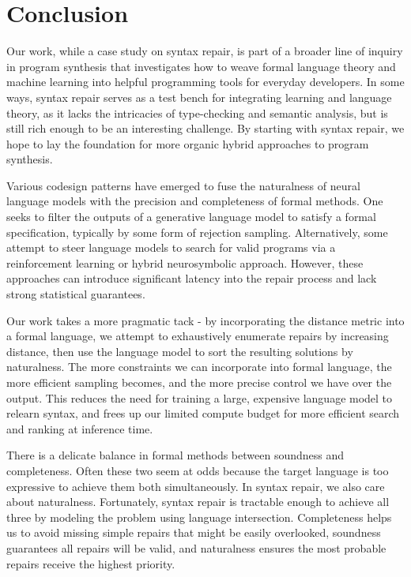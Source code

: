 \documentclass[popl.tex]{subfiles}
\begin{document}
\section{Conclusion}\label{sec:conclusion}

Our work, while a case study on syntax repair, is part of a broader line of inquiry in program synthesis that investigates how to weave formal language theory and machine learning into helpful programming tools for everyday developers. In some ways, syntax repair serves as a test bench for integrating learning and language theory, as it lacks the intricacies of type-checking and semantic analysis, but is still rich enough to be an interesting challenge. By starting with syntax repair, we hope to lay the foundation for more organic hybrid approaches to program synthesis.

Various codesign patterns have emerged to fuse the naturalness of neural language models with the precision and completeness of formal methods. One seeks to filter the outputs of a generative language model to satisfy a formal specification, typically by some form of rejection sampling. Alternatively, some attempt to steer language models to search for valid programs via a reinforcement learning or hybrid neurosymbolic approach. However, these approaches can introduce significant latency into the repair process and lack strong statistical guarantees.

Our work takes a more pragmatic tack - by incorporating the distance metric into a formal language, we attempt to exhaustively enumerate repairs by increasing distance, then use the language model to sort the resulting solutions by naturalness. The more constraints we can incorporate into formal language, the more efficient sampling becomes, and the more precise control we have over the output. This reduces the need for training a large, expensive language model to relearn syntax, and frees up our limited compute budget for more efficient search and ranking at inference time.

There is a delicate balance in formal methods between soundness and completeness. Often these two seem at odds because the target language is too expressive to achieve them both simultaneously. In syntax repair, we also care about naturalness. Fortunately, syntax repair is tractable enough to achieve all three by modeling the problem using language intersection. Completeness helps us to avoid missing simple repairs that might be easily overlooked, soundness guarantees all repairs will be valid, and naturalness ensures the most probable repairs receive the highest priority.
\end{document}
